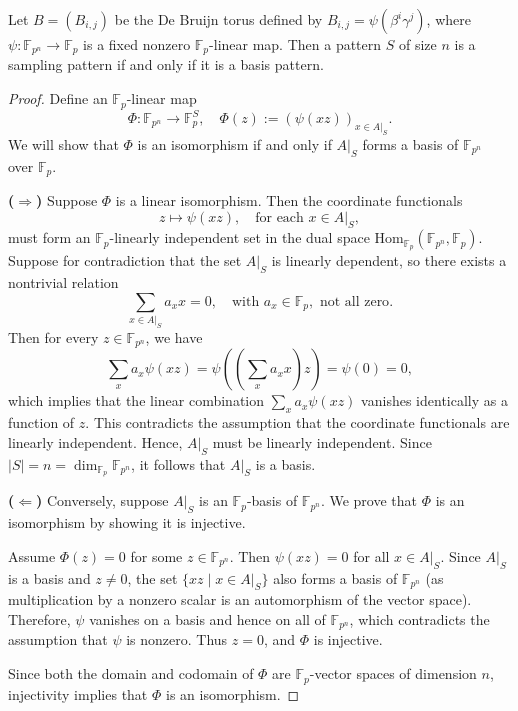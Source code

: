 \documentclass[10pt,a4paper]{amsart}
\begin{document}
\begin{theorem}
Let \( B = (B_{i,j}) \) be the De Bruijn torus defined by \( B_{i,j} = \psi(\beta^i \gamma^j) \), where \( \psi: \mathbb{F}_{p^n} \to \mathbb{F}_p \) is a fixed nonzero \(\mathbb{F}_p\)-linear map. Then a pattern \( S\) of size $n$ is a sampling pattern if and only if  it is a basis pattern.
\end{theorem}

\begin{proof}
Define an \(\mathbb{F}_p\)-linear map
\[
\Phi: \mathbb{F}_{p^n} \to \mathbb{F}_p^{S}, \quad
\Phi(z) := \left( \psi(x z) \right)_{x \in A|_S}.
\]
We will show that \(\Phi\) is an isomorphism if and only if \( A|_S \) forms a basis of \( \mathbb{F}_{p^n} \) over \(\mathbb{F}_p\).

\textbf{(\(\Rightarrow\))} Suppose \(\Phi\) is a linear isomorphism. Then the coordinate functionals
\[
z \mapsto \psi(x z), \quad \text{for each } x \in A|_S,
\]
must form an \(\mathbb{F}_p\)-linearly independent set in the dual space \( \mathrm{Hom}_{\mathbb{F}_p}(\mathbb{F}_{p^n}, \mathbb{F}_p) \). Suppose for contradiction that the set \( A|_S \) is linearly dependent, so there exists a nontrivial relation
\[
\sum_{x \in A|_S} a_x x = 0, \quad \text{with } a_x \in \mathbb{F}_p, \text{ not all zero}.
\]
Then for every \( z \in \mathbb{F}_{p^n} \), we have
\[
\sum_{x} a_x \psi(x z) = \psi\left( \left( \sum_{x} a_x x \right) z \right) = \psi(0) = 0,
\]
which implies that the linear combination \( \sum_{x} a_x \psi(x z) \) vanishes identically as a function of \( z \). This contradicts the assumption that the coordinate functionals are linearly independent. Hence, \( A|_S \) must be linearly independent. Since \( |S| = n = \dim_{\mathbb{F}_p} \mathbb{F}_{p^n} \), it follows that \( A|_S \) is a basis.

\textbf{(\(\Leftarrow\))} Conversely, suppose \( A|_S \) is an \(\mathbb{F}_p\)-basis of \( \mathbb{F}_{p^n} \). We prove that \(\Phi\) is an isomorphism by showing it is injective.

Assume \( \Phi(z) = 0 \) for some \( z \in \mathbb{F}_{p^n} \). Then \( \psi(x z) = 0 \) for all \( x \in A|_S \). Since \( A|_S \) is a basis and \( z \ne 0 \), the set \( \{ x z \mid x \in A|_S \} \) also forms a basis of \( \mathbb{F}_{p^n} \) (as multiplication by a nonzero scalar is an automorphism of the vector space). Therefore, \( \psi \) vanishes on a basis and hence on all of \( \mathbb{F}_{p^n} \), which contradicts the assumption that \( \psi \) is nonzero. Thus \( z = 0 \), and \(\Phi\) is injective.

Since both the domain and codomain of \(\Phi\) are \( \mathbb{F}_p \)-vector spaces of dimension \( n \), injectivity implies that \(\Phi\) is an isomorphism.
\end{proof}
\end{document}
